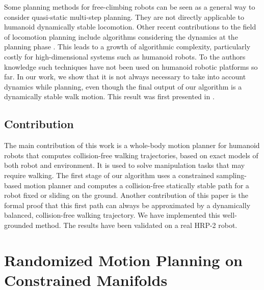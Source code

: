 \documentclass{article}
\begin{document}
Some planning methods for free-climbing robots \cite{bretl2006motion}
can be seen as a general way 
to consider quasi-static multi-step planning. They are not directly applicable to
humanoid dynamically stable locomotion.
Other recent contributions to the field of locomotion planning  include algorithms 
considering the dynamics at the planning phase \cite{shkolnik2011bounding}. This leads to 
a growth of algorithmic complexity, particularly costly for high-dimensional
systems such as humanoid robots. To the authors knowledge such techniques have not been
used on humanoid robotic platforms so far.
In our work, we show that it is not always
necessary to take into account dynamics while planning, even though the final
output of our algorithm is a dynamically stable walk motion. This result was first
presented in \cite{dalibard2011small}.



\subsection{Contribution}

The main contribution of this work is a  whole-body motion planner for humanoid robots
that computes collision-free walking trajectories, based on
exact models of both robot and environment. It is used to solve manipulation tasks
that may require walking. The first stage of our algorithm uses a
constrained sampling-based motion 
planner and  computes a collision-free  statically stable path  for a robot fixed or sliding 
on the ground. Another  contribution of this  paper is the formal  proof that
this first path can always be  approximated by a dynamically balanced, collision-free
walking  trajectory. We have implemented this well-grounded 
method.  The results have been validated on a real HRP-2 robot.

\section{Randomized Motion Planning on Constrained Manifolds}
\label{sec:wb}
\end{document}
